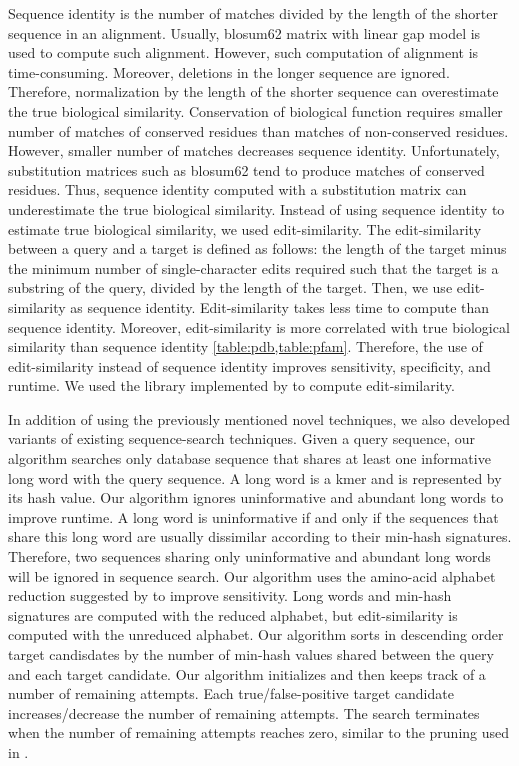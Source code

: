 \documentclass[]{article}
\begin{document}
Sequence identity is the number of matches divided by the length of the shorter sequence in an alignment.
Usually, blosum62 matrix with linear gap model is used to compute such alignment.
However, such computation of alignment is time-consuming.
Moreover, deletions in the longer sequence are ignored.
Therefore, normalization by the length of the shorter sequence can overestimate the true biological similarity.
Conservation of biological function requires smaller number of matches of conserved residues than matches of non-conserved residues. 
However, smaller number of matches decreases sequence identity.
Unfortunately, substitution matrices such as blosum62 tend to produce matches of conserved residues.
Thus, sequence identity computed with a substitution matrix can underestimate the true biological similarity.
Instead of using sequence identity to estimate true biological similarity, we used edit-similarity.
The edit-similarity between a query and a target is defined as follows: 
	the length of the target minus the minimum number of single-character edits required such that the target is a substring of the query, divided by the length of the target.
Then, we use edit-similarity as sequence identity.
Edit-similarity takes less time to compute \cite{vsovsic2017edlib} than sequence identity.
Moreover, edit-similarity is more correlated with true biological similarity than sequence identity \cref{table:pdb,table:pfam}.
Therefore, the use of edit-similarity instead of sequence identity improves sensitivity, specificity, and runtime.
We used the library implemented by \citet{vsovsic2017edlib} to compute edit-similarity.

In addition of using the previously mentioned novel techniques, we also developed variants of existing sequence-search techniques.
Given a query sequence, our algorithm searches only database sequence that shares at least one informative long word with the query sequence.
A long word is a kmer and is represented by its hash value.
Our algorithm ignores uninformative and abundant long words to improve runtime.
A long word is uninformative if and only if the sequences that share this long word are usually dissimilar according to their min-hash signatures.
Therefore, two sequences sharing only uninformative and abundant long words will be ignored in sequence search.
Our algorithm uses the amino-acid alphabet reduction suggested by \cite{murphy2000simplified} to improve sensitivity.
Long words and min-hash signatures are computed with the reduced alphabet, but edit-similarity is computed with the unreduced alphabet.
Our algorithm sorts in descending order target candisdates by the number of min-hash values shared between the query and each target candidate.
Our algorithm initializes and then keeps track of a number of remaining attempts.
Each true/false-positive target candidate increases/decrease the number of remaining attempts.
The search terminates when the number of remaining attempts reaches zero, similar to the pruning used in \cite{edgar2010search}.
\end{document}
